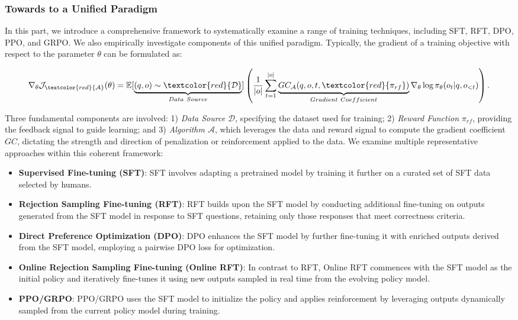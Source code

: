 \begin{itemize}[topsep=0pt]
\subsubsection{Towards to a Unified Paradigm} 
In this part, we introduce a comprehensive framework to systematically examine a range of training techniques, including SFT, RFT, DPO, PPO, and GRPO. We also empirically investigate components of this unified paradigm. Typically, the gradient of a training objective with respect to the parameter $\theta$ can be formulated as:

\begin{equation}
    \nabla_{\theta}\mathcal{J}_{\textcolor{red}{\mathcal{A}}}(\theta) = \mathbb{E}[\underbrace{(q,o) \sim \textcolor{red}{\mathcal{D}}}_{Data \ Source}]\left( \frac{1}{|o|} \sum_{t=1}^{|o|}  \underbrace{GC_{{\mathcal{A}}}(q, o, t, \textcolor{red}{\pi_{{rf}}})}_{Gradient \ Coefficient}  \nabla_{\theta}\log \pi_{\theta}(o_t | q, o_{<t})\right).
\label{eq:objective}
\end{equation}

Three fundamental components are involved: 1) \textit{Data Source $\mathcal{D}$}, specifying the dataset used for training; 2) \textit{Reward Function $\pi_{{rf}}$}, providing the feedback signal to guide learning; and 3) \textit{Algorithm $\mathcal{A}$}, which leverages the data and reward signal to compute the gradient coefficient $GC$, dictating the strength and direction of penalization or reinforcement applied to the data. We examine multiple representative approaches within this coherent framework:

\begin{itemize}
    \item \textbf{Supervised Fine-tuning (SFT)}: SFT involves adapting a pretrained model by training it further on a curated set of SFT data selected by humans.
    \item \textbf{Rejection Sampling Fine-tuning (RFT)}: RFT builds upon the SFT model by conducting additional fine-tuning on outputs generated from the SFT model in response to SFT questions, retaining only those responses that meet correctness criteria.
    \item \textbf{Direct Preference Optimization (DPO)}: DPO enhances the SFT model by further fine-tuning it with enriched outputs derived from the SFT model, employing a pairwise DPO loss for optimization.
    \item \textbf{Online Rejection Sampling Fine-tuning (Online RFT)}: In contrast to RFT, Online RFT commences with the SFT model as the initial policy and iteratively fine-tunes it using new outputs sampled in real time from the evolving policy model.
    \item \textbf{PPO/GRPO}: PPO/GRPO uses the SFT model to initialize the policy and applies reinforcement by leveraging outputs dynamically sampled from the current policy model during training.
\end{itemize}


\end{itemize}
